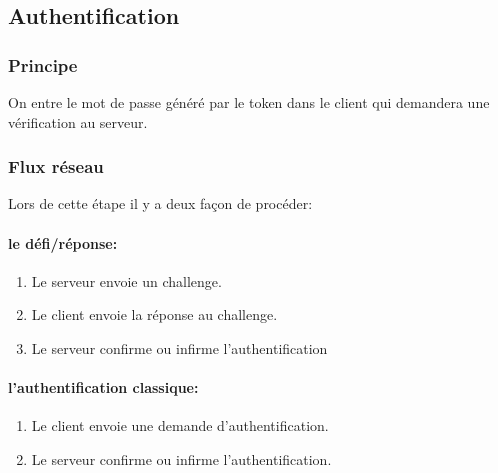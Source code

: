 \documentclass{"../../res/univ-projet"}
\begin{document}
\subsection{Authentification}
\subsubsection{Principe}
On entre le mot de passe généré par le token dans le client qui demandera une
vérification au serveur.

\subsubsection{Flux réseau}
Lors de cette étape il y a deux façon de procéder:

    \paragraph{le défi/réponse:}
    \begin{enumerate}
        \item Le serveur envoie un challenge.
        \item Le client envoie la réponse au challenge.
        \item Le serveur confirme ou infirme l'authentification
    \end{enumerate}
    \paragraph{l'authentification classique:}
    \begin{enumerate}
        \item Le client envoie une demande d'authentification.
        \item Le serveur confirme ou infirme l'authentification.
    \end{enumerate}
\end{document}
